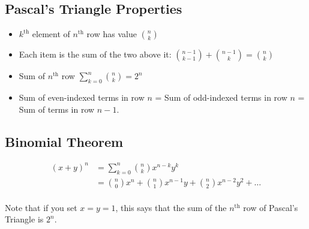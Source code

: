 \documentclass[12pt]{article}
\begin{document}
\subsection{Pascal's Triangle Properties}
\begin{itemize}
\item $k^{\text{th}}$ element of $n^{\text{th}}$ row has value $\binom{n}{k}$
\item Each item is the sum of the two above it: $\binom{n-1}{k-1} + \binom{n-1}{k} = \binom{n}{k}$
\item Sum of $n^{\text{th}}$ row $\sum_{k=0}^{n}\binom{n}{k}=2^n$
\item Sum of even-indexed terms in row $n$ = Sum of odd-indexed terms in row $n$ = Sum of terms in row $n-1$.
\end{itemize}
\subsection{Binomial Theorem}
\begin{align*}
    (x+y)^n &= \sum_{k=0}^n \binom{n}{k}x^{n-k}y^k\\
    &= \binom{n}{0}x^n + \binom{n}{1}x^{n-1}y + \binom{n}{2}x^{n-2}y^2 + \ldots\\
\end{align*}

Note that if you set $x=y=1$, this says that the sum of the $n^{\text{th}}$ row  of Pascal's Triangle is $2^n$.
\pagebreak
\end{document}
